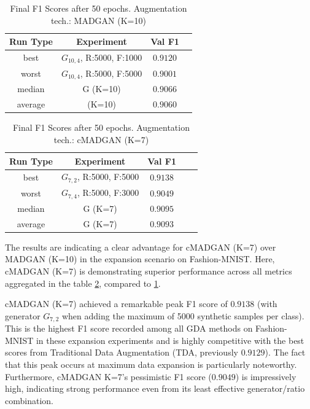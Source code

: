 \begin{table}[H]
	\vspace{-1.5em}
	\centering
	\begin{tabular}{|c|c|c|c|}
		\hline
		Run Type & Experiment & Val F1 \\ \hline
		best & \(G_{10, 4}\), R:5000, F:1000 & $0.9120$\\ \hline
		worst & \(G_{10, 4}\), R:5000, F:5000 & $0.9001$\\ \hline
		median & G (K=10) & $0.9066$\\ \hline
		average & (K=10) & $0.9060$
		\\ \hline
	\end{tabular}
    \caption{Final F1 Scores after 50 epochs. Augmentation tech.: MADGAN (K=10)}
        \label{tab:res_expansion_fashion_cmadgan_vs_madgan__madgan}
\end{table}
\begin{table}[H]
	\centering
	\vspace{-1.5em}
	\begin{tabular}{|c|c|c|c|c|}
		\hline
		Run Type & Experiment & Val F1 \\ \hline
		best & \(G_{7, 2}\), R:5000, F:5000 & $0.9138$\\ \hline
		worst & \(G_{7, 4}\), R:5000, F:3000 & $0.9049$\\ \hline
		median & G (K=7) & $0.9095$\\ \hline
		average & G (K=7) & $0.9093$
		\\ \hline
	\end{tabular}
    \caption{Final F1 Scores after 50 epochs. Augmentation tech.: cMADGAN (K=7)}
        \label{tab:res_expansion_fashion_cmadgan_vs_madgan__cmadgan}
\end{table}

The results are indicating a clear advantage for cMADGAN (K=7) over MADGAN (K=10) in the expansion scenario on Fashion-MNIST. Here, cMADGAN (K=7) is demonstrating superior performance across all metrics aggregated in the table \ref{tab:res_expansion_fashion_cmadgan_vs_madgan__cmadgan}, compared to \ref{tab:res_expansion_fashion_cmadgan_vs_madgan__madgan}.

cMADGAN (K=7) achieved a remarkable peak F1 score of $0.9138$ (with generator \(G_{7,2}\) when adding the maximum of 5000 synthetic samples per class). This is the highest F1 score recorded among all GDA methods on Fashion-MNIST in these expansion experiments and is highly competitive with the best scores from Traditional Data Augmentation (TDA, previously $0.9129$). The fact that this peak occurs at maximum data expansion is particularly noteworthy. Furthermore, cMADGAN K=7's pessimistic F1 score ($0.9049$) is impressively high, indicating strong performance even from its least effective generator/ratio combination.

